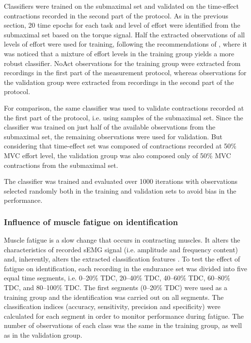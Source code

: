 Classifiers were trained on the submaximal set and validated on the time-effect contractions recorded in the second part of the protocol. As in the previous section, 20 time epochs for each task and level of effort were identified from the submaximal set based on the torque signal. Half the extracted observations of all levels of effort were used for training, following the recommendations of \citet{Scheme2013}, where it was noticed that a mixture of effort levels in the training group yields a more robust classifier. NoAct observations for the training group were extracted from recordings in the first part of the measurement protocol, whereas observations for the validation group were extracted from recordings in the second part of the protocol.

For comparison, the same classifier was used to validate contractions recorded at the first part of the protocol, i.e. using samples of the submaximal set. Since the classifier was trained on just half of the available observations from the submaximal set, the remaining observations were used for validation. But considering that time-effect set was composed of contractions recorded at 50\% MVC effort level, the validation group was also composed only of 50\% MVC contractions from the submaximal set.

The classifier was trained and evaluated over 1000 iterations with observations selected randomly both in the training and validation sets to avoid bias in the performance.



\subsubsection{Influence of muscle fatigue on identification}
Muscle fatigue is a slow change that occurs in contracting muscles. It alters the characteristics of recorded sEMG signal (i.e. amplitude and frequency content) \citep{DeLuca1984} and, inherently, alters the extracted classification features \citep{Wan2010}. To test the effect of fatigue on identification, each recording in the endurance set was divided into five equal time segments, i.e. 0–20\% TDC, 20–40\% TDC, 40–60\% TDC, 60–80\% TDC, and 80–100\% TDC. The first segments (0–20\% TDC) were used as a training group and the identification was carried out on all segments. The classification indices (accuracy, sensitivity, precision and specificity) were calculated for each segment in order to monitor performance during fatigue. The number of observations of each class was the same in the training group, as well as in the validation group.


